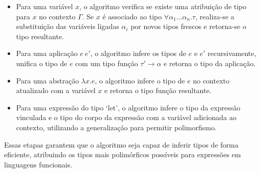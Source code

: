 \begin{itemize}
  \item Para uma variável $x$, o algoritmo verifica se existe uma atribuição de tipo para $x$ no contexto $\Gamma$. Se $x$ é associado ao tipo $\forall \alpha_1 \ldots \alpha_n . \tau$, realiza-se a substituição das variáveis ligadas $\alpha_i$ por novos tipos frescos e retorna-se o tipo resultante.
  
  \item Para uma aplicação $e\ e'$, o algoritmo infere os tipos de $e$ e $e'$ recursivamente, unifica o tipo de $e$ com um tipo função $\tau' \to \alpha$ e retorna o tipo da aplicação.
  
  \item Para uma abstração $\lambda x . e$, o algoritmo infere o tipo de $e$ no contexto atualizado com a variável $x$ e retorna o tipo função resultante.
  
  \item Para uma expressão do tipo `let', o algoritmo infere o tipo da expressão vinculada e o tipo do corpo da expressão com a variável adicionada ao contexto, utilizando a generalização para permitir polimorfismo.
\end{itemize}

Essas etapas garantem que o algoritmo seja capaz de inferir tipos de forma eficiente, atribuindo os tipos mais polimórficos possíveis para expressões em linguagens funcionais.
